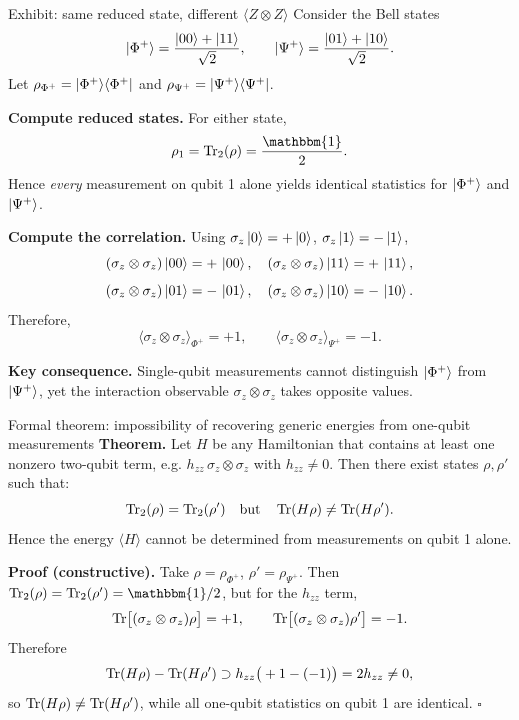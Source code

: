\documentclass[aspectratio=169]{beamer}
\newcommand{\Z}{\sigma_z}
\newcommand{\I}{\mathbbm{1}}
\begin{document}
\begin{frame}{Exhibit: same reduced state, different \(\langle Z\otimes Z\rangle\)}
Consider the Bell states
\[
\ket{\Phi^+}=\frac{\ket{00}+\ket{11}}{\sqrt{2}},\qquad
\ket{\Psi^+}=\frac{\ket{01}+\ket{10}}{\sqrt{2}}.
\]
Let \(\rho_{\Phi^+}=\ket{\Phi^+}\!\bra{\Phi^+}\) and \(\rho_{\Psi^+}=\ket{\Psi^+}\!\bra{\Psi^+}\).

\medskip
\textbf{Compute reduced states.}
For either state,
\[
\rho_1=\Tr_2(\rho)=\frac{\I}{2}.
\]
Hence \emph{every} measurement on qubit 1 alone yields identical statistics for \(\ket{\Phi^+}\) and \(\ket{\Psi^+}\).

\medskip
\textbf{Compute the correlation.}
Using \(\Z\ket{0}=+\ket{0}\), \(\Z\ket{1}=-\ket{1}\),
\[
(\Z\otimes\Z)\ket{00}=+\,\ket{00},\quad (\Z\otimes\Z)\ket{11}=+\,\ket{11},
\]
\[
(\Z\otimes\Z)\ket{01}=-\,\ket{01},\quad (\Z\otimes\Z)\ket{10}=-\,\ket{10}.
\]
Therefore,
\[
\langle \Z\otimes\Z\rangle_{\Phi^+}=+1,\qquad
\langle \Z\otimes\Z\rangle_{\Psi^+}=-1.
\]

\medskip
\textbf{Key consequence.} Single-qubit measurements cannot distinguish \(\ket{\Phi^+}\) from \(\ket{\Psi^+}\),
yet the interaction observable \(\Z\otimes\Z\) takes opposite values.
\end{frame}

\begin{frame}{Formal theorem: impossibility of recovering generic energies from one-qubit measurements}
\textbf{Theorem.}
Let \(H\) be any Hamiltonian that contains at least one nonzero two-qubit term, e.g. \(h_{zz}\,\Z\otimes\Z\) with \(h_{zz}\neq 0\).
Then there exist states \(\rho,\rho'\) such that:
\[
\Tr_2(\rho)=\Tr_2(\rho')\quad\text{but}\quad \Tr(H\rho)\neq \Tr(H\rho').
\]
Hence the energy \(\langle H\rangle\) cannot be determined from measurements on qubit 1 alone.

\medskip
\textbf{Proof (constructive).}
Take \(\rho=\rho_{\Phi^+}\), \(\rho'=\rho_{\Psi^+}\). Then \(\Tr_2(\rho)=\Tr_2(\rho')=\I/2\),
but for the \(h_{zz}\) term,
\[
\Tr\!\big[(\Z\otimes\Z)\rho\big]=+1,\qquad \Tr\!\big[(\Z\otimes\Z)\rho'\big]=-1.
\]
Therefore
\[
\Tr(H\rho)-\Tr(H\rho') \supset h_{zz}\big(+1-(-1)\big)=2h_{zz}\neq 0,
\]
so \(\Tr(H\rho)\neq \Tr(H\rho')\), while all one-qubit statistics on qubit 1 are identical.
\(\square\)
\end{frame}
\end{document}
